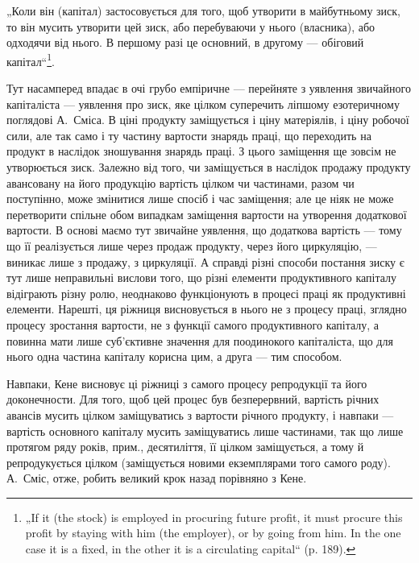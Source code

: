 „Коли він (капітал) застосовується для того, щоб утворити в майбутньому
зиск, то він мусить утворити цей зиск, або перебуваючи у
нього (власника), або одходячи від нього. В першому разі це основний,
в другому — обіговий капітал“\footnote*{
„If it (the stock) is employed in procuring future profit, it must procure this
profit by staying with him (the employer), or by going from him. In the one case
it is a fixed, in the other it is a circulating capital“ (p. 189).
}.

Тут насамперед впадає в очі грубо емпіричне — перейняте з уявлення
звичайного капіталіста — уявлення про зиск, яке цілком суперечить ліпшому
езотеричному поглядові А.~Сміса. В ціні продукту заміщується і ціну
матеріялів, і ціну робочої сили, але так само і ту частину вартости знарядь
праці, що переходить на продукт в наслідок зношування знарядь
праці. З цього заміщення ще зовсім не утворюється зиск. Залежно від
того, чи заміщується в наслідок продажу продукту авансовану на його
продукцію вартість цілком чи частинами, разом чи поступінно, може змінитися
лише спосіб і час заміщення; але це ніяк не може перетворити
спільне обом випадкам заміщення вартости на утворення додаткової вартости.
В основі маємо тут звичайне уявлення, що додаткова вартість —
тому що її реалізується лише через продаж продукту, через його циркуляцію,
— виникає лише з продажу, з циркуляції. А справді різні
способи постання зиску є тут лише неправильні вислови того, що різні
елементи продуктивного капіталу відіграють різну ролю, неоднаково
функціонують в процесі праці як продуктивні елементи. Нарешті, ця
ріжниця висновується в нього не з процесу праці, зглядно процесу зростання
вартости, не з функції самого продуктивного капіталу, а повинна
мати лише суб’єктивне значення для поодинокого капіталіста, що для
нього одна частина капіталу корисна цим, а друга — тим способом.

Навпаки, Кене висновує ці ріжниці з самого процесу репродукції
та його доконечности. Для того, щоб цей процес був безперервний,
вартість річних авансів мусить цілком заміщуватись з вартости річного
продукту, і навпаки — вартість основного капіталу мусить заміщуватись
лише частинами, так що лише протягом ряду років, прим., десятиліття,
її цілком заміщується, а тому й репродукується цілком (заміщується новими
екземплярами того самого роду). А.~Сміс, отже, робить великий
крок назад порівняно з Кене.

